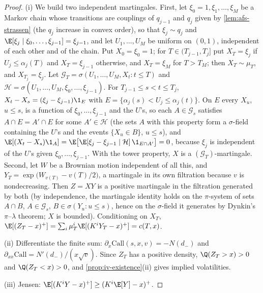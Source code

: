 \begin{proof}
(i) We build two independent martingales. First, let $\xi_0=1,\xi_1,\dots,\xi_M$ be a Markov chain whose transitions are
couplings of $q_{j-1}$ and $q_j$ given by \cref{lem:afs-strassen} (the $q_j$ increase in convex order), so that $\xi_j\sim q_j$
and $\E[\xi_j\mid\xi_0,\dots,\xi_{j-1}]=\xi_{j-1}$, and let $U_1,\dots,U_M$ be uniform on $(0,1)$, independent of each other and of
the chain. Put $X_0=\xi_0=1$; for $T\in(T_{j-1},T_j]$ put $X_T=\xi_j$ if $U_j\le\alpha_j(T)$ and $X_T=\xi_{j-1}$ otherwise, and $X_T=\xi_M$
for $T>T_M$; then $X_T\sim\mu_T$, and $X_{T_j}=\xi_j$. Let $\mathcal G_T=\sigma(U_1,\dots,U_M,X_t:t\le T)$ and
$\mathcal H=\sigma(U_1,\dots,U_M,\xi_0,\dots,\xi_{j-1})$. For $T_{j-1}\le s<t\le T_j$, $X_t-X_s=(\xi_j-\xi_{j-1})\1_E$ with
$E=\{\alpha_j(s)<U_j\le\alpha_j(t)\}$. On $E$ every $X_u$, $u\le s$, is a function of $\xi_0,\dots,\xi_{j-1}$ and the $U$'s, so each
$A\in\mathcal G_s$ satisfies $A\cap E=A'\cap E$ for some $A'\in\mathcal H$ (the sets $A$ with this property form a $\sigma$-field
containing the $U$'s and the events $\{X_u\in B\}$, $u\le s$), and
$\E[(X_t-X_s)\1_A]=\E\big[\E[\xi_j-\xi_{j-1}\mid\mathcal H]\,\1_{E\cap A'}\big]=0$, because $\xi_j$ is independent of the $U$'s given
$\xi_0,\dots,\xi_{j-1}$. With the tower property, $X$ is a $(\mathcal G_T)$-martingale. Second, let $W$ be a Brownian motion
independent of all this, and $Y_T=\exp\big(W_{v(T)}-v(T)/2\big)$, a martingale in its own filtration because $v$ is
nondecreasing. Then $Z=XY$ is a positive martingale in the filtration generated by both (by independence, the martingale
identity holds on the $\pi$-system of sets $A\cap B$, $A\in\mathcal G_s$, $B\in\sigma(Y_u:u\le s)$, hence on the $\sigma$-field it
generates by Dynkin's $\pi$--$\lambda$ theorem; $X$ is bounded). Conditioning on $X_T$,
$\E[(Z_T-x)^+]=\sum_i\mu_T^i\E[(K^iY_T-x)^+]=c(T,x)$.

(ii) Differentiate the finite sum: $\partial_x\mathrm{Call}(s,x,v)=-N(d_-)$ and $\partial_{xx}\mathrm{Call}=N'(d_-)/(x\sqrt v)$.
Since $Z_T$ has a positive density, $\Q(Z_T>x)>0$ and $\Q(Z_T<x)>0$, and \cref{prop:iv-existence}(ii) gives implied
volatilities.

(iii) Jensen: $\E[(K^iY-x)^+]\ge(K^i\E[Y]-x)^+$.
\end{proof}

